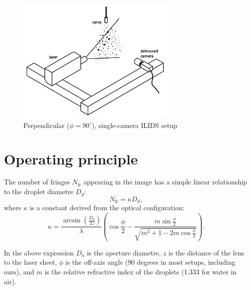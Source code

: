 \documentclass[11.5pt]{book}
\begin{document}
\begin{figure}
\centering
\includegraphics[width=0.7\textwidth]{img/setup/ipi_setup_simple.pdf}
\caption{Perpendicular ($\phi=90^\circ$), single-camera ILIDS setup
\label{fig:ipi-setup-simple}}
\end{figure}
\section{Operating principle}
The number of fringes $N_\text{fr}$ appearing in the image has a simple linear relationship to
the droplet diametre $D_d$:
\begin{equation}
    N_\text{fr} = \kappa D_d,
\end{equation}
where $\kappa$ is a constant derived from the optical configuration:
\begin{equation}
    \kappa = \frac{\arcsin\left(\frac{D_a}{2z}\right)}{\lambda}
    \left(\cos\frac{\phi}{2} - \frac{m \sin\frac{\phi}{2}}{\sqrt{m^2 + 1 -
    2m\cos \frac{\phi}{2}}}\right).
    \label{kappa}
\end{equation}

In the above expression $D_a$ is the aperture diametre, $z$ is the distance of
the lens to the laser sheet, $\phi$ is the off-axis angle (90 degrees in most
setups, including ours), and $m$ is the relative refractive index of the
droplets (1.333 for water in air).
\end{document}
